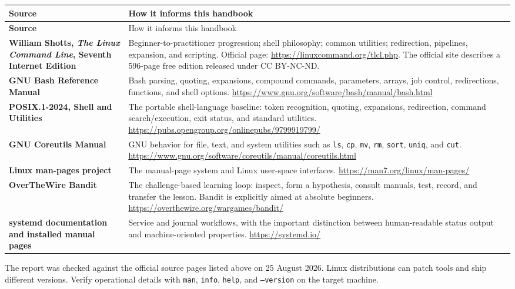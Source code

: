\documentclass[11pt,oneside,openany]{book}
\begin{document}
\begin{longtable}{>{\bfseries}p{}p{}}
\toprule
Source & How it informs this handbook \\
\midrule
\endfirsthead
\toprule
Source & How it informs this handbook \\
\midrule
\endhead
William Shotts, \emph{The Linux Command Line}, Seventh Internet Edition & Beginner-to-practitioner progression; shell philosophy; common utilities; redirection, pipelines, expansion, and scripting. Official page: \url{https://linuxcommand.org/tlcl.php}. The official site describes a 596-page free edition released under CC BY-NC-ND. \\
GNU Bash Reference Manual & Bash parsing, quoting, expansions, compound commands, parameters, arrays, job control, redirections, functions, and shell options. \url{https://www.gnu.org/software/bash/manual/bash.html} \\
POSIX.1-2024, Shell and Utilities & The portable shell-language baseline: token recognition, quoting, expansions, redirection, command search/execution, exit status, and standard utilities. \url{https://pubs.opengroup.org/onlinepubs/9799919799/} \\
GNU Coreutils Manual & GNU behavior for file, text, and system utilities such as \texttt{ls}, \texttt{cp}, \texttt{mv}, \texttt{rm}, \texttt{sort}, \texttt{uniq}, and \texttt{cut}. \url{https://www.gnu.org/software/coreutils/manual/coreutils.html} \\
Linux man-pages project & The manual-page system and Linux user-space interfaces. \url{https://man7.org/linux/man-pages/} \\
OverTheWire Bandit & The challenge-based learning loop: inspect, form a hypothesis, consult manuals, test, record, and transfer the lesson. Bandit is explicitly aimed at absolute beginners. \url{https://overthewire.org/wargames/bandit/} \\
systemd documentation and installed manual pages & Service and journal workflows, with the important distinction between human-readable status output and machine-oriented properties. \url{https://systemd.io/} \\
\bottomrule
\end{longtable}

\begin{sourcebox}
The report was checked against the official source pages listed above on 25 August 2026. Linux distributions can patch tools and ship different versions. Verify operational details with \texttt{man}, \texttt{info}, \texttt{help}, and \texttt{--version} on the target machine.
\end{sourcebox}
\end{document}
